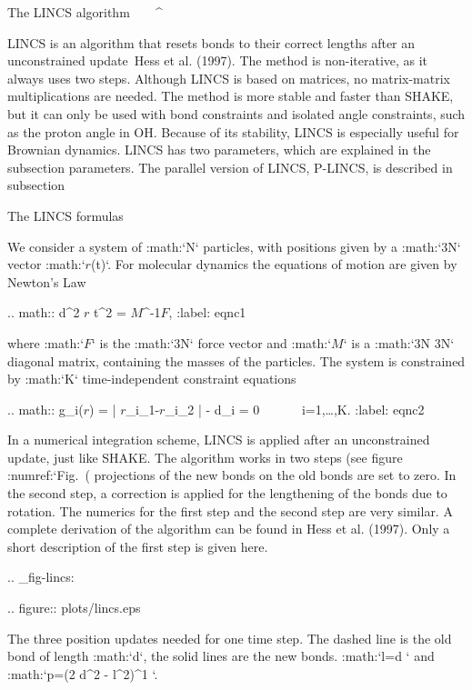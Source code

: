 The LINCS algorithm
^^^^^^^^^^^^^^^^^^^

LINCS is an algorithm that resets bonds to their correct lengths after
an unconstrained update Hess et al. (1997). The method is non-iterative,
as it always uses two steps. Although LINCS is based on matrices, no
matrix-matrix multiplications are needed. The method is more stable and
faster than SHAKE, but it can only be used with bond constraints and
isolated angle constraints, such as the proton angle in OH. Because of
its stability, LINCS is especially useful for Brownian dynamics. LINCS
has two parameters, which are explained in the subsection parameters.
The parallel version of LINCS, P-LINCS, is described in subsection

The LINCS formulas
^^^^^^^^^^^^^^^^^^

We consider a system of :math:`N` particles, with positions given by a
:math:`3N` vector :math:`{\mbox{\boldmath ${r}$}}(t)`. For molecular
dynamics the equations of motion are given by Newton’s Law

.. math:: {{\mbox{d}}^2 {\mbox{\boldmath ${r}$}} t^2} = {{{\mbox{\boldmath ${M}$}}}^{-1}}{\mbox{\boldmath ${F}$}},
          :label: eqnc1

where :math:`{\mbox{\boldmath ${F}$}}` is the :math:`3N` force vector
and :math:`{{\mbox{\boldmath ${M}$}}}` is a :math:`3N \times 3N`
diagonal matrix, containing the masses of the particles. The system is
constrained by :math:`K` time-independent constraint equations

.. math:: g_i({\mbox{\boldmath ${r}$}}) = | {\mbox{\boldmath ${r}$}}_{i_1}-{\mbox{\boldmath ${r}$}}_{i_2} | - d_i = 0 ~~~~~~i=1,\ldots,K.
          :label: eqnc2

In a numerical integration scheme, LINCS is applied after an
unconstrained update, just like SHAKE. The algorithm works in two steps
(see figure :numref:`Fig. (%
projections of the new bonds on the old bonds are set to zero. In the
second step, a correction is applied for the lengthening of the bonds
due to rotation. The numerics for the first step and the second step are
very similar. A complete derivation of the algorithm can be found in
Hess et al. (1997). Only a short description of the first step is given
here.

.. _fig-lincs:

.. figure:: plots/lincs.eps

   The three position updates needed for one time step. The dashed
   line is the old bond of length :math:`d`, the solid lines are the new
   bonds. :math:`l=d \cos \theta` and :math:`p=(2 d^2 - l^2)^{1 }`.

